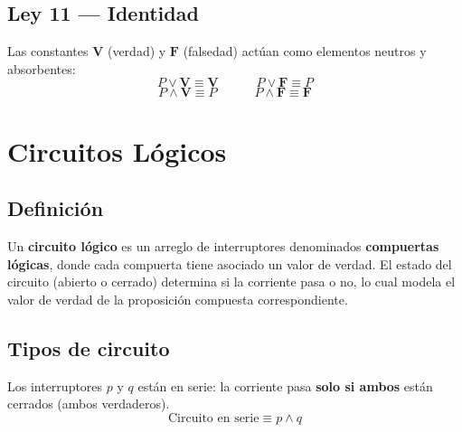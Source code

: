 \subsection{Ley 11 — Identidad}

\begin{cajaprop}[11 — Identidad]
  Las constantes $\mathbf{V}$ (verdad) y $\mathbf{F}$ (falsedad) actúan
  como elementos neutros y absorbentes:
  \[
    P \vee \mathbf{V} \equiv \mathbf{V} \qquad\quad
    P \vee \mathbf{F} \equiv P
  \]
  \[
    P \wedge \mathbf{V} \equiv P \qquad\quad
    P \wedge \mathbf{F} \equiv \mathbf{F}
  \]
\end{cajaprop}

\section{Circuitos L\'{o}gicos}

\subsection{Definición}

\begin{cajadef}
  Un \textbf{circuito lógico} es un arreglo de interruptores denominados
  \textbf{compuertas lógicas}, donde cada compuerta tiene asociado un valor
  de verdad. El estado del circuito (abierto o cerrado) determina si la
  corriente pasa o no, lo cual modela el valor de verdad de la proposición
  compuesta correspondiente.
\end{cajadef}

\subsection{Tipos de circuito}

\begin{cajaprop}
  Los interruptores $p$ y $q$ están en serie: la corriente pasa
  \textbf{solo si ambos} están cerrados (ambos verdaderos).
  \[
    \text{Circuito en serie} \equiv p \wedge q
  \]
  \begin{center}
  \end{center}
\end{cajaprop}


